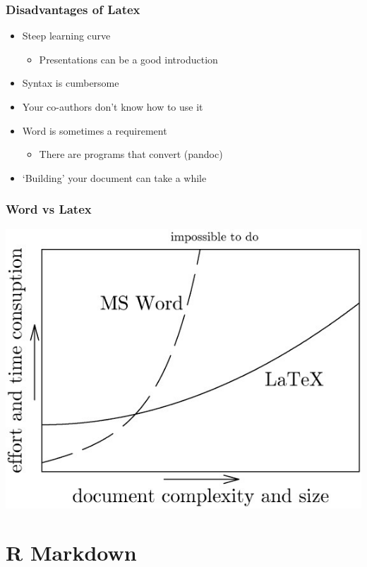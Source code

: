 \documentclass{beamer}
\begin{document}

\begin{frame}[t]\frametitle{Disadvantages of Latex}
	\begin{itemize}
		\item Steep learning curve 
		\begin{itemize}
			\item Presentations can be a good introduction
		\end{itemize}
		\item Syntax is cumbersome
		\item Your co-authors don't know how to use it
		\item Word is sometimes a requirement
		\begin{itemize}
			\item There are programs that convert (pandoc)
		\end{itemize}
		\item `Building' your document can take a while
	\end{itemize}
\end{frame}

\begin{frame}[t]\frametitle{Word vs Latex}
	\centering\includegraphics[height=0.8\textheight]{latex_vs_word.jpg}
\end{frame}

\section{R Markdown}
\end{document}
